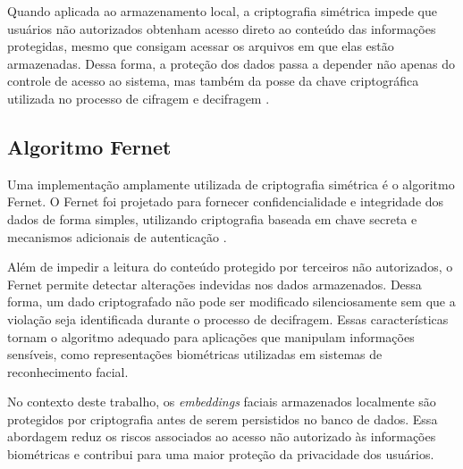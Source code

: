Quando aplicada ao armazenamento local, a criptografia simétrica impede que usuários não autorizados obtenham acesso direto ao conteúdo das informações protegidas, mesmo que consigam acessar os arquivos em que elas estão armazenadas. Dessa forma, a proteção dos dados passa a depender não apenas do controle de acesso ao sistema, mas também da posse da chave criptográfica utilizada no processo de cifragem e decifragem \cite{stallings2017cns}.

\subsection{Algoritmo Fernet}

Uma implementação amplamente utilizada de criptografia simétrica é o algoritmo Fernet. O Fernet foi projetado para fornecer confidencialidade e integridade dos dados de forma simples, utilizando criptografia baseada em chave secreta e mecanismos adicionais de autenticação \cite{cryptography_fernet}.

Além de impedir a leitura do conteúdo protegido por terceiros não autorizados, o Fernet permite detectar alterações indevidas nos dados armazenados. Dessa forma, um dado criptografado não pode ser modificado silenciosamente sem que a violação seja identificada durante o processo de decifragem. Essas características tornam o algoritmo adequado para aplicações que manipulam informações sensíveis, como representações biométricas utilizadas em sistemas de reconhecimento facial.

No contexto deste trabalho, os \textit{embeddings} faciais armazenados localmente são protegidos por criptografia antes de serem persistidos no banco de dados. Essa abordagem reduz os riscos associados ao acesso não autorizado às informações biométricas e contribui para uma maior proteção da privacidade dos usuários.
